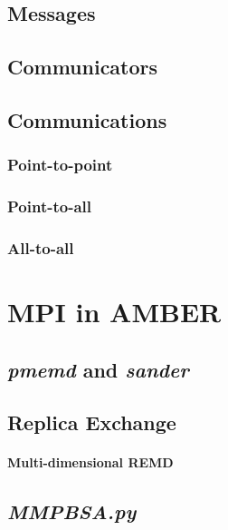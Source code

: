 \subsection{Messages}

\subsection{Communicators}

\subsection{Communications}

\subsubsection{Point-to-point}

\subsubsection{Point-to-all}

\subsubsection{All-to-all}

\section{MPI in AMBER}

\subsection{\emph{pmemd} and \emph{sander}}

\subsection{Replica Exchange}

\paragraph{Multi-dimensional REMD}

\subsection{\emph{MMPBSA.py}}
